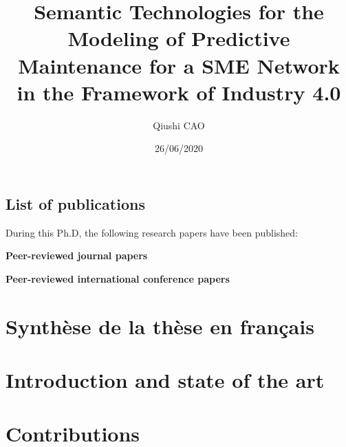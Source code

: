 \documentclass[a4paper, 12pt, twoside,openright]{report}
\author{Qiushi CAO}
\title{Semantic Technologies for the Modeling of Predictive Maintenance for a SME Network in the Framework of Industry 4.0}
\date{26/06/2020}
\begin{document}
	{\footnotesize
	\pagedegarde}
	\cleardoublepage

			\setcounter{tocdepth}{2}	%
			
			
			\dominitoc						%
			\tableofcontents
			
\chapter*{List of publications}
%
During this Ph.D, the following research papers have been published:
\begin{flushleft}
\textbf{Peer-reviewed journal papers}
\end{flushleft}

\begin{flushleft}
\textbf{Peer-reviewed international conference papers}
\end{flushleft}

			\listoffigures
		\listoftables
	\setcounter{mtc}{2}	%

	\part{Synthèse de la thèse en français}
	
	
	\part{Introduction and state of the art}
	
	
	
	
	
	\part{Contributions}
	
	
	
	
	
	
\end{document}
